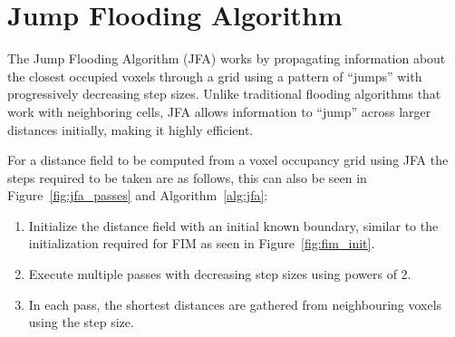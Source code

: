 \section{Jump Flooding Algorithm} \label{sec:jfa}
The Jump Flooding Algorithm (JFA) works by propagating information about the closest occupied voxels through a grid
using a pattern of ``jumps'' with progressively decreasing step sizes. Unlike traditional flooding algorithms that work
with neighboring cells, JFA allows information to ``jump'' across larger distances initially, making it highly efficient.

For a distance field to be computed from a voxel occupancy grid using JFA the steps required to be taken are as follows,
this can also be seen in Figure~\ref{fig:jfa_passes} and Algorithm~\ref{alg:jfa}:

\begin{enumerate}
    \item Initialize the distance field with an initial known boundary, similar to the initialization required for FIM as
          seen in Figure~\ref{fig:fim_init}.
    \item Execute multiple passes with decreasing step sizes using powers of 2.
    \item In each pass, the shortest distances are gathered from neighbouring voxels using the step size.
\end{enumerate}

